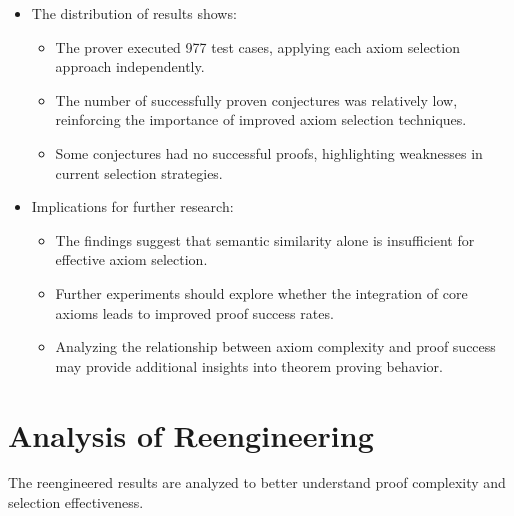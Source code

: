 \documentclass[english,version-2020-11]{uzl-thesis}
\begin{document}
\begin{itemize}
    \item The distribution of results shows:
    \begin{itemize}
        \item The prover executed 977 test cases, applying each axiom selection approach independently.
        \item The number of successfully proven conjectures was relatively low, reinforcing the importance of improved axiom selection techniques.
        \item Some conjectures had no successful proofs, highlighting weaknesses in current selection strategies.
    \end{itemize}

    \item Implications for further research:
    \begin{itemize}
        \item The findings suggest that semantic similarity alone is insufficient for effective axiom selection.
        \item Further experiments should explore whether the integration of core axioms leads to improved proof success rates.
        \item Analyzing the relationship between axiom complexity and proof success may provide additional insights into theorem proving behavior.
    \end{itemize}
\end{itemize}

\clearpage

\section{Analysis of Reengineering}

The reengineered results are analyzed to better understand proof complexity and selection effectiveness.
\end{document}

